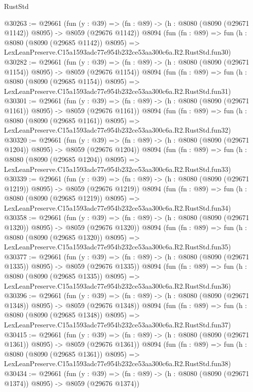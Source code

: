 \begin{lexlean}{RustStd}
\begin{coremodule}
@30263 := @29661
    (fun (y : @39) =>
    (fn : @89) -> (h : @8080 (@8090 (@29671 @1142)) @8095) -> @8059 (@29676 @1142))
    @8094
    (fun (fn : @89) =>
    fun (h : @8080 (@8090 (@29685 @1142)) @8095) =>
    LexLeanPreserve.C15a1593adc77e954b232ce53aa300c6a.R2.RustStd.fun30)
@30282 := @29661
    (fun (y : @39) =>
    (fn : @89) -> (h : @8080 (@8090 (@29671 @1154)) @8095) -> @8059 (@29676 @1154))
    @8094
    (fun (fn : @89) =>
    fun (h : @8080 (@8090 (@29685 @1154)) @8095) =>
    LexLeanPreserve.C15a1593adc77e954b232ce53aa300c6a.R2.RustStd.fun31)
@30301 := @29661
    (fun (y : @39) =>
    (fn : @89) -> (h : @8080 (@8090 (@29671 @1161)) @8095) -> @8059 (@29676 @1161))
    @8094
    (fun (fn : @89) =>
    fun (h : @8080 (@8090 (@29685 @1161)) @8095) =>
    LexLeanPreserve.C15a1593adc77e954b232ce53aa300c6a.R2.RustStd.fun32)
@30320 := @29661
    (fun (y : @39) =>
    (fn : @89) -> (h : @8080 (@8090 (@29671 @1204)) @8095) -> @8059 (@29676 @1204))
    @8094
    (fun (fn : @89) =>
    fun (h : @8080 (@8090 (@29685 @1204)) @8095) =>
    LexLeanPreserve.C15a1593adc77e954b232ce53aa300c6a.R2.RustStd.fun33)
@30339 := @29661
    (fun (y : @39) =>
    (fn : @89) -> (h : @8080 (@8090 (@29671 @1219)) @8095) -> @8059 (@29676 @1219))
    @8094
    (fun (fn : @89) =>
    fun (h : @8080 (@8090 (@29685 @1219)) @8095) =>
    LexLeanPreserve.C15a1593adc77e954b232ce53aa300c6a.R2.RustStd.fun34)
@30358 := @29661
    (fun (y : @39) =>
    (fn : @89) -> (h : @8080 (@8090 (@29671 @1320)) @8095) -> @8059 (@29676 @1320))
    @8094
    (fun (fn : @89) =>
    fun (h : @8080 (@8090 (@29685 @1320)) @8095) =>
    LexLeanPreserve.C15a1593adc77e954b232ce53aa300c6a.R2.RustStd.fun35)
@30377 := @29661
    (fun (y : @39) =>
    (fn : @89) -> (h : @8080 (@8090 (@29671 @1335)) @8095) -> @8059 (@29676 @1335))
    @8094
    (fun (fn : @89) =>
    fun (h : @8080 (@8090 (@29685 @1335)) @8095) =>
    LexLeanPreserve.C15a1593adc77e954b232ce53aa300c6a.R2.RustStd.fun36)
@30396 := @29661
    (fun (y : @39) =>
    (fn : @89) -> (h : @8080 (@8090 (@29671 @1348)) @8095) -> @8059 (@29676 @1348))
    @8094
    (fun (fn : @89) =>
    fun (h : @8080 (@8090 (@29685 @1348)) @8095) =>
    LexLeanPreserve.C15a1593adc77e954b232ce53aa300c6a.R2.RustStd.fun37)
@30415 := @29661
    (fun (y : @39) =>
    (fn : @89) -> (h : @8080 (@8090 (@29671 @1361)) @8095) -> @8059 (@29676 @1361))
    @8094
    (fun (fn : @89) =>
    fun (h : @8080 (@8090 (@29685 @1361)) @8095) =>
    LexLeanPreserve.C15a1593adc77e954b232ce53aa300c6a.R2.RustStd.fun38)
@30434 := @29661
    (fun (y : @39) =>
    (fn : @89) -> (h : @8080 (@8090 (@29671 @1374)) @8095) -> @8059 (@29676 @1374))

\end{coremodule}
\end{lexlean}
